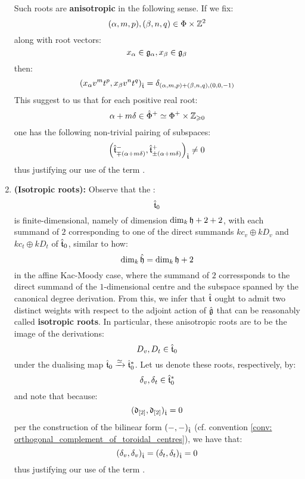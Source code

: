 \begin{remark}
\begin{enumerate}
                Such roots are \textbf{anisotropic} in the following sense. If we fix:
                    $$(\alpha, m, p), (\beta, n, q) \in \Phi \x \Z^2$$
                along with root vectors:
                    $$x_{\alpha} \in \mathfrak{g}_{\alpha}, x_{\beta} \in \mathfrak{g}_{\beta}$$
                then:
                    $$( x_{\alpha} v^m t^p, x_{\beta} v^n t^q )_{\hat{\mathfrak{t}}} = \delta_{(\alpha, m, p) + (\beta, n, q), (0, 0, -1)}$$
                This suggest to us that for each positive real root:
                    $$\alpha + m\delta \in \hat{\Phi}^+ \cong \Phi^+ \x \Z_{\geq 0}$$
                one has the following non-trivial pairing of subspaces:
                    $$\left( \hat{\mathfrak{t}}^-_{\mp (\alpha + m\delta)}, \hat{\mathfrak{t}}^+_{\pm (\alpha + m\delta)} \right)_{\hat{\mathfrak{t}}} \not = 0$$
                thus justifying our use of the term .
                \item \textbf{(Isotropic roots):} Observe that the :
                    $$\hat{\mathfrak{t}}_0$$
                is finite-dimensional, namely of dimension $\dim_{k} \mathfrak{h} + 2 + 2$, with each summand of $2$ corresponding to one of the direct summands $k c_v \oplus k D_v$ and $k c_t \oplus k D_t$ of $\hat{\mathfrak{t}}_0$, similar to how:
                    $$\dim_{k} \hat{\mathfrak{h}} = \dim_{k} \mathfrak{h} + 2$$
                in the affine Kac-Moody case, where the summand of $2$ corressponds to the direct summand of the $1$-dimensional centre and the subspace spanned by the canonical degree derivation. From this, we infer that $\hat{\mathfrak{t}}$ ought to admit two distinct weights with respect to the adjoint action of $\hat{\mathfrak{g}}$ that can be reasonably called \textbf{isotropic roots}. In particular, these anisotropic roots are to be the image of the derivations:
                    $$D_v, D_t \in \hat{\mathfrak{t}}_0$$
                under the dualising map $\hat{\mathfrak{t}}_0 \xrightarrow[]{\simeq} \hat{\mathfrak{t}}_0^*$. Let us denote these roots, respectively, by:
                    $$\delta_v, \delta_t \in \hat{\mathfrak{t}}_0^*$$
                and note that because:
                    $$(\mathfrak{d}_{[2]}, \mathfrak{d}_{[2]})_{\hat{\mathfrak{t}}} = 0$$
                per the construction of the bilinear form $(-, -)_{\hat{\mathfrak{t}}}$ (cf. convention \ref{conv: orthogonal_complement_of_toroidal_centres}), we have that:
                    $$(\delta_v, \delta_v)_{\hat{\mathfrak{t}}} = (\delta_t, \delta_t)_{\hat{\mathfrak{t}}} = 0$$
                thus justifying our use of the term .


\end{enumerate}
\end{remark}
